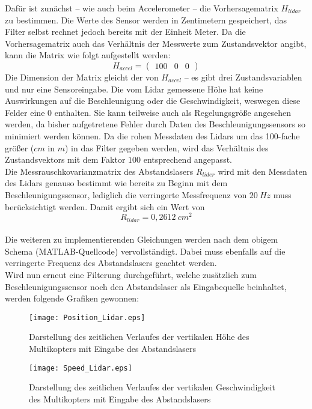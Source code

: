 \documentclass[12pt,a4paper]{article}
\begin{document}
\begin{enumerate}[label=\textbf{\arabic*})]
\begin{enumerate}[label=\textbf{\alph*})]
		Dafür ist zunächst -- wie auch beim Accelerometer -- die Vorhersagematrix $H_{lidar}$ zu bestimmen. Die Werte des Sensor werden in Zentimetern gespeichert, das Filter selbst rechnet jedoch bereits mit der Einheit Meter. Da die Vorhersagematrix auch das Verhältnis der Messwerte zum Zustandsvektor angibt, kann die Matrix wie folgt aufgestellt werden:
		\begin{equation}\label{eq:Vorhersagematrix_lidar}
			H_{accel}=
				\begin{pmatrix}
				100& 0 & 0
				\end{pmatrix}
		\end{equation}
		Die Dimension der Matrix gleicht der von $H_{accel}$ -- es gibt drei Zustandsvariablen und nur eine Sensoreingabe. Die vom Lidar gemessene Höhe hat keine Auswirkungen auf die Beschleunigung oder die Geschwindigkeit, weswegen diese Felder eine $0$ enthalten. Sie kann teilweise auch als Regelungsgröße angesehen werden, da bisher aufgetretene Fehler durch Daten des Beschleunigungssensors so minimiert werden können. Da die rohen Messdaten des Lidars um das 100-fache größer ($cm$ in $m$) in das Filter gegeben werden, wird das Verhältnis des Zustandsvektors mit dem Faktor $100$ entsprechend angepasst.\\
		
		Die Messrauschkovarianzmatrix des Abstandslasers $R_{lider}$ wird mit den Messdaten des Lidars genauso bestimmt wie bereits zu Beginn mit dem Beschleunigungssensor, lediglich die verringerte Messfrequenz von $20~Hz$ muss berücksichtigt werden. Damit ergibt sich ein Wert von
		\begin{equation}\label{eq:Messrauschkovarianzmatrix_Lidar}
			R_{lidar}=0,2612~cm^{2}
		\end{equation}\\
		
		Die weiteren zu implementierenden Gleichungen werden nach dem obigem Schema (MATLAB-Quellcode) vervollständigt. Dabei muss ebenfalls auf die verringerte Frequenz des Abstandslasers geachtet werden.\\
		
		Wird nun erneut eine Filterung durchgeführt, welche zusätzlich zum Beschleunigungssensor noch den Abstandslaser als Eingabequelle beinhaltet, werden folgende Grafiken gewonnen:\\
		\begin{figure}[!ht]
			\centering
			\texttt{[image: Position\_Lidar.eps]}
			\caption{\label{fig:KalmanHoehe_Lidar}Darstellung des zeitlichen Verlaufes der vertikalen Höhe des Multikopters mit Eingabe des Abstandslasers}
		\end{figure}
		\begin{figure}[!ht]
			\centering
			\texttt{[image: Speed\_Lidar.eps]}
			\caption{\label{fig:KalmanGeschwindigkeit_Lidar}Darstellung des zeitlichen Verlaufes der vertikalen Geschwindigkeit des Multikopters mit Eingabe des Abstandslasers}
		\end{figure}
	

\end{enumerate}
\end{enumerate}
\end{document}
